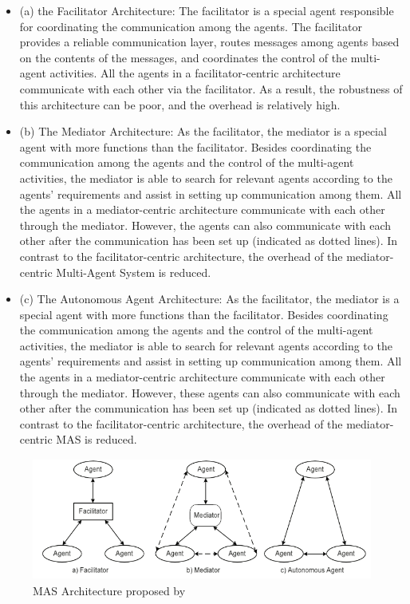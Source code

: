\begin{itemize}
    \item (a) the Facilitator Architecture: The facilitator is a special agent responsible for coordinating the communication among the agents. The facilitator provides a reliable communication layer, routes messages among agents based on the contents of the messages, and coordinates the control of the multi-agent activities. All the agents in a facilitator-centric architecture communicate with each other via the facilitator. As a result, the robustness of this architecture can be poor, and the overhead is relatively high.
    \item (b) The Mediator Architecture: As the facilitator, the mediator is a special agent with more functions than the facilitator. Besides coordinating the communication among the agents and the control of the multi-agent activities, the mediator is able to search for relevant agents according to the agents’ requirements and assist in setting up communication among them. All the agents in a mediator-centric architecture communicate with each other through the mediator. However, the agents can also communicate with each other after the communication has been set up (indicated as dotted lines). In contrast to the facilitator-centric architecture, the overhead of the mediator-centric Multi-Agent System is reduced.
    \item (c) The Autonomous Agent Architecture: As the facilitator, the mediator is a special agent with more functions than the facilitator. Besides coordinating the communication among the agents and the control of the multi-agent activities, the mediator is able to search for relevant agents according to the agents’ requirements and assist in setting up communication among them. All the agents in a mediator-centric architecture communicate with each other through the mediator. However, these agents can also communicate with each other after the communication has been set up (indicated as dotted lines). In contrast to the facilitator-centric architecture, the overhead of the mediator- centric MAS is reduced.
\end{itemize}


\begin{figure}[h]
    \centering
    \includegraphics[height=4cm, keepaspectratio]{images/liu-mas-architecture}
    \caption{MAS Architecture proposed by \textcite{liu_resource_2011}}
    \label{fig:liu-mas-architecture}
\end{figure}

